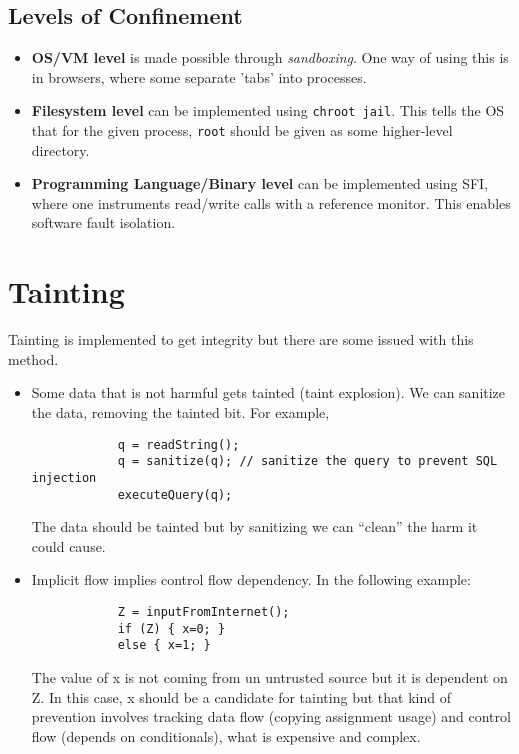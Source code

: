 \documentclass[twoside]{article}
\begin{document}
\subsection{Levels of Confinement}

\begin{itemize}
\item \textbf{OS/VM level} is made possible through \textit{sandboxing}. One way of using this is in browsers, where some separate 'tabs' into processes.
\item \textbf{Filesystem level} can be implemented using \texttt{chroot jail}. This tells the OS that for the given process, \texttt{root} should be given as some higher-level directory.
\item \textbf{Programming Language/Binary level} can be implemented using \textsc{SFI}, where one instruments read/write calls with a reference monitor. This enables software fault isolation.
\end{itemize}

\section{Tainting}

Tainting is implemented to get integrity but there are some issued with this method.

\begin{itemize}
	\item Some data that is not harmful gets tainted (taint explosion). We can sanitize the data, removing the tainted bit. For example,
		\begin{verbatim}
			q = readString();
			q = sanitize(q); // sanitize the query to prevent SQL injection
			executeQuery(q);
		\end{verbatim}
	The data should be tainted but by sanitizing we can ``clean'' the harm it could cause.
	
	\item Implicit flow implies control flow dependency. In the following example: 	
		\begin{verbatim}
			Z = inputFromInternet();
			if (Z) { x=0; }
			else { x=1; }
		\end{verbatim}
	The value of x is not coming from un untrusted source but it is dependent on Z. In this case, x should be a candidate 
	for tainting but that kind of prevention involves tracking data flow (copying assignment usage) and control flow (depends on conditionals), what is expensive
	and complex. 
\end{itemize}
\end{document}
